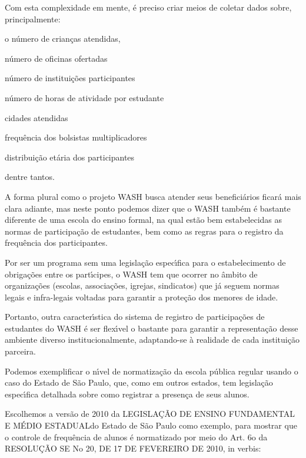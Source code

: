 \documentclass[
12pt,		%
openright,	%
twoside,  %
a4paper,			%
chapter=TITLE,		%
english,			%
french,				%
spanish,			%
brazil				%
]{USPSC-classe/USPSC}
\begin{document}
Com esta complexidade em mente, \'e preciso criar meios de coletar dados sobre, principalmente:



\begin{alineas}
\item o n\'umero de crian\c{c}as atendidas,
\item n\'umero de oficinas ofertadas
\item n\'umero de institui\c{c}\~oes participantes
\item n\'umero de horas de atividade por estudante
\item cidades atendidas
\item frequ\^encia dos bolsistas multiplicadores
\item distribui\c{c}\~ao et\'aria dos participantes
\end{alineas}

dentre tantos.


A forma plural como o projeto WASH busca atender seus benefici\'arios ficar\'a mais clara adiante, mas neste ponto podemos dizer que o WASH tamb\'em \'e bastante diferente de uma escola do ensino formal, na qual est\~ao bem estabelecidas as normas de participa\c{c}\~ao de estudantes, bem como as regras para o registro da frequ\^encia dos participantes.


Por ser um programa sem uma legisla\c{c}\~ao espec\'{\i}fica para o estabelecimento de obriga\c{c}\~oes entre os part\'{\i}cipes, o WASH tem que ocorrer no \^ambito de organiza\c{c}\~oes (escolas, associa\c{c}\~oes, igrejas, sindicatos) que j\'a seguem normas legais e infra-legais voltadas para garantir a prote\c{c}\~ao dos menores de idade.


Portanto, outra caracter\'{\i}stica do sistema de registro de participa\c{c}\~oes de estudantes do WASH \'e ser flex\'{\i}vel o bastante para garantir a representa\c{c}\~ao desse ambiente diverso institucionalmente, adaptando-se \`a realidade de cada institui\c{c}\~ao parceira.


Podemos exemplificar o n\'{\i}vel de normatiza\c{c}\~ao da escola p\'ublica regular usando o caso do Estado de S\~ao Paulo, que, como em outros estados, tem legisla\c{c}\~ao espec\'{\i}fica detalhada sobre como registrar a presen\c{c}a de seus alunos.


Escolhemos a vers\~ao de 2010 da \textquotedbl LEGISLA\c{C}\~AO DE ENSINO FUNDAMENTAL E M\'EDIO ESTADUAL\textquotedbl  do Estado de S\~ao Paulo como exemplo, para mostrar que o controle de frequ\^encia de alunos \'e normatizado por meio do Art. 6o da RESOLU\c{C}\~AO SE No 20, DE 17 DE FEVEREIRO DE 2010, in verbis:
\end{document}

